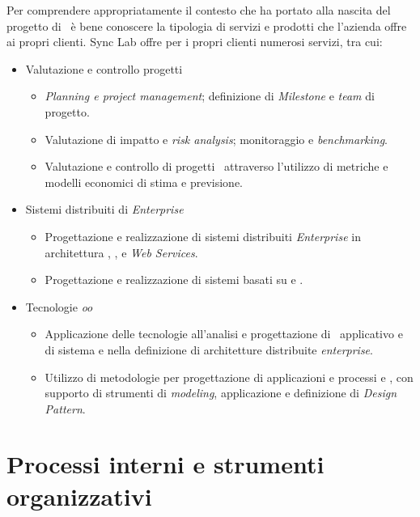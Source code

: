 Per comprendere appropriatamente il contesto che ha portato alla nascita del progetto di \stage\, è bene conoscere la tipologia di servizi e prodotti che l'azienda offre ai propri clienti.
Sync Lab offre per i propri clienti numerosi servizi, tra cui:
\begin{itemize}
  \item Valutazione e controllo progetti
    \begin{itemize}
      \item \textit{Planning e project management}; definizione di \textit{Milestone} e \textit{team} di progetto.
      \item Valutazione di impatto e \textit{risk analysis}; monitoraggio e \textit{benchmarking}.
      \item Valutazione e controllo di progetti \software\ attraverso l’utilizzo di metriche e modelli economici di stima e previsione.
    \end{itemize}
    \item Sistemi distribuiti di \textit{Enterprise}
      \begin{itemize}
        \item Progettazione e realizzazione di sistemi distribuiti \textit{Enterprise} in architettura , ,  e \textit{Web Services}.
        \item Progettazione e realizzazione di sistemi basati su  e .
      \end{itemize}
    \item Tecnologie \textit{\acrlong{oo}}
    \begin{itemize}
      \item Applicazione delle tecnologie  all’analisi e progettazione di \software\ applicativo e di sistema e nella definizione di architetture distribuite \textit{enterprise}.
      \item Utilizzo di metodologie  per progettazione di applicazioni e processi e , con supporto di strumenti di \textit{modeling}, applicazione e definizione di \textit{Design Pattern}.
    \end{itemize}
\end{itemize}


\section{Processi interni e strumenti organizzativi}

